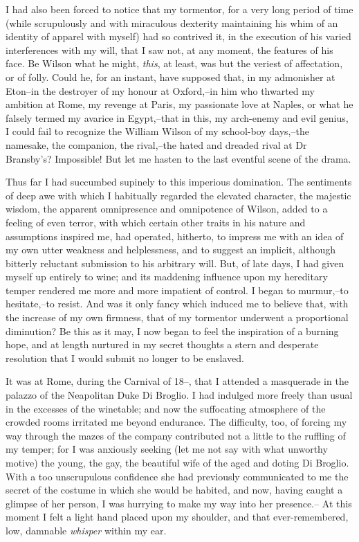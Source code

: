 \documentclass[12pt]{book}
\begin{document}
     I had also been forced to notice that my tormentor, for a very
long period of time (while scrupulously and with miraculous
dexterity maintaining his whim of an identity of apparel with
myself) had so contrived it, in the execution of his varied
interferences with my will, that I saw not, at any moment, the
features of his face.  Be Wilson what he might, \emph{this}, at least,
was but the veriest of affectation, or of folly.  Could he, for an
instant, have supposed that, in my admonisher at Eton--in the
destroyer of my honour at Oxford,--in him who thwarted my ambition
at Rome, my revenge at Paris, my passionate love at Naples, or what
he falsely termed my avarice in Egypt,--that in this, my arch-enemy
and evil genius, I could fail to recognize the William Wilson of my
school-boy days,--the namesake, the companion, the rival,--the
hated and dreaded rival at Dr Bransby's?  Impossible!  But let me
hasten to the last eventful scene of the drama.

     Thus far I had succumbed supinely to this imperious
domination.  The sentiments of deep awe with which I habitually
regarded the elevated character, the majestic wisdom, the apparent
omnipresence and omnipotence of Wilson, added to a feeling of even
terror, with which certain other traits in his nature and
assumptions inspired me, had operated, hitherto, to impress me with
an idea of my own utter weakness and helplessness, and to suggest
an implicit, although bitterly reluctant submission to his
arbitrary will.  But, of late days, I had given myself up entirely
to wine; and its maddening influence upon my hereditary temper
rendered me more and more impatient of control.  I began to
murmur,--to hesitate,--to resist.  And was it only fancy which
induced me to believe that, with the increase of my own firmness,
that of my tormentor underwent a proportional diminution?  Be this
as it may, I now began to feel the inspiration of a burning hope,
and at length nurtured in my secret thoughts a stern and desperate
resolution that I would submit no longer to be enslaved.

     It was at Rome, during the Carnival of 18--, that I attended
a masquerade in the palazzo of the Neapolitan Duke Di Broglio.  I
had indulged more freely than usual in the excesses of the 
winetable; and now the suffocating atmosphere of the crowded rooms
irritated me beyond endurance.  The difficulty, too, of forcing my
way through the mazes of the company contributed not a little to
the ruffling of my temper; for I was anxiously seeking (let me not
say with what unworthy motive) the young, the gay, the beautiful
wife of the aged and doting Di Broglio.  With a too unscrupulous
confidence she had previously communicated to me the secret of the
costume in which she would be habited, and now, having caught a
glimpse of her person, I was hurrying to make my way into her
presence.--  At this moment I felt a light hand placed upon my
shoulder, and that ever-remembered, low, damnable \emph{whisper}
within my ear.
\end{document}

